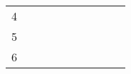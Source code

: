 \begin{table}[ht]
\begin{tabular}{c|lllllllll}
    4                                                                                                          &                                                                              &                                                          &                                                           &                                                                &                                                                  &                                                                                                                 &                                                                                                                &                                                                                                                                &                                                            \\
    5                                                                                                          &                                                                              &                                                          &                                                           &                                                                &                                                                  &                                                                                                                 &                                                                                                                &                                                                                                                                &                                                            \\
    6                                                                                                          &                                                                              &                                                          &                                                           &                                                                &                                                                  &                                                                                                                 &                                                                                                                &                                                                                                                                &                                                            \\

\end{tabular}
\end{table}
